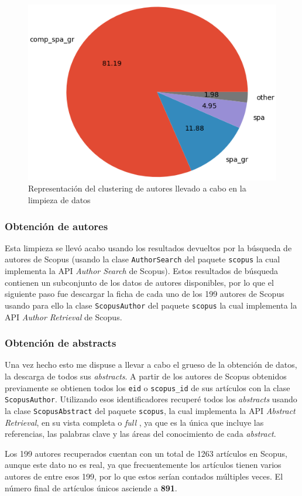 \begin{figure}[h]
	
	\centering
	\includegraphics[width=0.5\linewidth]{imagenes/class_pie}
	\caption{Representación del clustering de autores llevado a cabo en la limpieza de datos}
\end{figure}

\subsubsection{Obtención de autores}
Esta limpieza se llevó acabo usando los resultados devueltos por la búsqueda de autores de Scopus (usando la clase \texttt{AuthorSearch} del paquete \texttt{scopus} la cual implementa la \acrshort{API} \textit{Author Search} de Scopus). Estos resultados de búsqueda contienen un subconjunto de los datos de autores disponibles, por lo que el siguiente paso fue descargar la ficha de cada uno de los 199 autores de Scopus usando para ello la clase \texttt{ScopusAuthor} del paquete \texttt{scopus} la cual implementa la \acrshort{API} \textit{Author Retrieval} de Scopus.

\subsubsection{Obtención de abstracts}
Una vez hecho esto me dispuse a llevar a cabo el grueso de la obtención de datos, la descarga de todos sus \textit{abstracts}. A partir de los autores de Scopus obtenidos previamente se obtienen todos los \texttt{eid} o \texttt{scopus\_id} de sus artículos con la clase \texttt{ScopusAuthor}. Utilizando esos identificadores recuperé todos los \textit{abstracts} usando la clase \texttt{ScopusAbstract} del paquete \texttt{scopus}, la cual implementa la \acrshort{API} \textit{Abstract Retrieval}, en su vista completa o \textit{full} \cite{scopusAbstractViews}, ya que es la única que incluye las referencias, las palabras clave y las áreas del conocimiento de cada \textit{abstract}.

Los 199 autores recuperados cuentan con un total de 1263 artículos en Scopus, aunque este dato no es real, ya que frecuentemente los artículos tienen varios autores de entre esos 199, por lo que estos serían contados múltiples veces. El número final de artículos únicos asciende a \textbf{891}.

